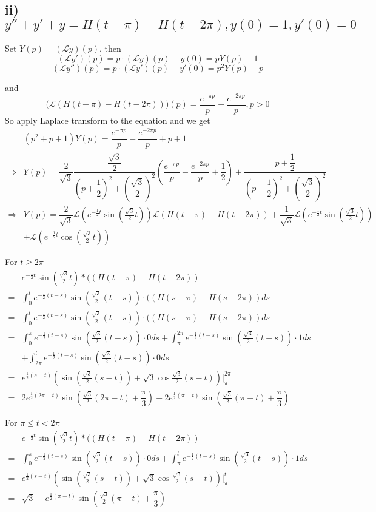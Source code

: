 \documentclass[a4paper,12pt,titlepage]{article}
\begin{document}
\subsection*{ii)$y''+y'+y=H(t-\pi)-H(t-2\pi), y(0)=1,y'(0)=0$}
Set $Y(p)=(\mathcal{L}y)(p)$, then
$$(\mathcal{L}y')(p)=p\cdot(\mathcal{L}y)(p)-y(0)=pY(p)-1 $$
$$(\mathcal{L}y'')(p)=p\cdot(\mathcal{L}y')(p)-y'(0)=p^2Y(p)-p $$

and
$$\Big(\mathcal{L}(H(t-\pi)-H(t-2\pi))\Big)(p)=\dfrac{e^{-\pi p}}{p}-\dfrac{e^{-2\pi p}}{p},p>0$$
So apply Laplace transform to the equation and we get
\begin{align*}
&(p^2+p+1)Y(p)=\dfrac{e^{-\pi p}}{p}-\dfrac{e^{-2\pi p}}{p}+p+1\\
\Rightarrow& Y(p)=\dfrac{2}{\sqrt{3}}\dfrac{\dfrac{\sqrt{3}}{2}}{(p+\dfrac{1}{2})^2+(\dfrac{\sqrt{3}}{2})^2}(\dfrac{e^{-\pi p}}{p}-\dfrac{e^{-2\pi p}}{p}+\dfrac{1}{2})+\dfrac{p+\dfrac{1}{2}}{(p+\dfrac{1}{2})^2+(\dfrac{\sqrt{3}}{2})^2}\\
\Rightarrow& Y(p)=\dfrac{2}{\sqrt{3}}\mathcal{L}(e^{-\frac{1}{2}t}\sin(\frac{\sqrt{3}}{2}t))\mathcal{L}(H(t-\pi)-H(t-2\pi))+\dfrac{1}{\sqrt{3}}\mathcal{L}(e^{-\frac{1}{2}t}\sin(\frac{\sqrt{3}}{2}t))\\
&+\mathcal{L}(e^{-\frac{1}{2}t}\cos(\frac{\sqrt{3}}{2}t))
\end{align*}

For $t\geqslant2\pi$
\begin{align*}
&e^{-\frac{1}{2}t}\sin(\frac{\sqrt{3}}{2}t)*((H(t-\pi)-H(t-2\pi))\\
=&\int_0^t e^{-\frac{1}{2}(t-s)}\sin(\frac{\sqrt{3}}{2}(t-s))\cdot((H(s-\pi)-H(s-2\pi))ds \\
=&\int_0^t e^{-\frac{1}{2}(t-s)}\sin(\frac{\sqrt{3}}{2}(t-s))\cdot((H(s-\pi)-H(s-2\pi))ds\\
=&\int_0^{\pi} e^{-\frac{1}{2}(t-s)}\sin(\frac{\sqrt{3}}{2}(t-s))\cdot0ds+\int_{\pi}^{2\pi} e^{-\frac{1}{2}(t-s)}\sin(\frac{\sqrt{3}}{2}(t-s))\cdot 1ds\\
&+\int_{2\pi}^t e^{-\frac{1}{2}(t-s)}\sin(\frac{\sqrt{3}}{2}(t-s))\cdot0ds\\
=&e^{\frac{1}{2}(s-t)}(\sin(\frac{\sqrt{3}}{2}(s-t))+\sqrt{3}\cos \frac{\sqrt{3}}{2}(s-t))\Big|_{\pi}^{2\pi}    \\
=&2e^{\frac{1}{2}(2\pi-t)}\sin(\frac{\sqrt{3}}{2}(2\pi-t)+\dfrac{\pi}{3})-2e^{\frac{1}{2}(\pi-t)}\sin(\frac{\sqrt{3}}{2}(\pi-t)+\dfrac{\pi}{3})
\end{align*}

For $\pi\leqslant t<2\pi$
\begin{align*}
&e^{-\frac{1}{2}t}\sin(\frac{\sqrt{3}}{2}t)*((H(t-\pi)-H(t-2\pi))\\
=&\int_0^{\pi} e^{-\frac{1}{2}(t-s)}\sin(\frac{\sqrt{3}}{2}(t-s))\cdot0ds+\int_{\pi}^{t} e^{-\frac{1}{2}(t-s)}\sin(\frac{\sqrt{3}}{2}(t-s))\cdot 1ds\\
=&e^{\frac{1}{2}(s-t)}(\sin(\frac{\sqrt{3}}{2}(s-t))+\sqrt{3}\cos \frac{\sqrt{3}}{2}(s-t))\Big|_{\pi}^{t}    \\
=&\sqrt{3}-e^{\frac{1}{2}(\pi-t)}\sin(\frac{\sqrt{3}}{2}(\pi-t)+\dfrac{\pi}{3})
\end{align*}
\end{document}
